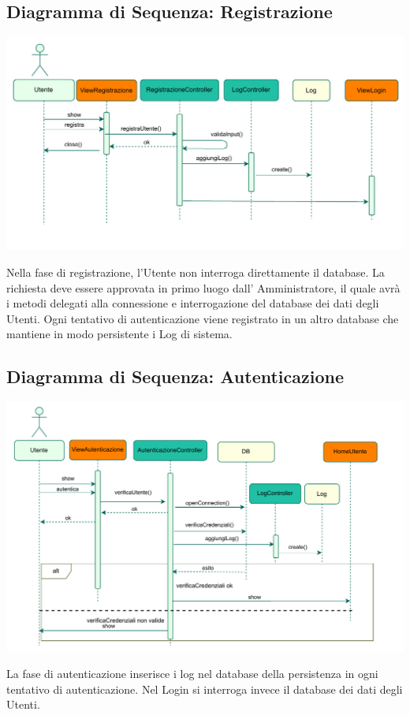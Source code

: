 \subsection*{Diagramma di Sequenza: Registrazione}
{}
\vspace{2cm}
\begin{adjustwidth}{-2cm}{0cm}
\includegraphics[scale=0.9]{progettazione/Diagramma-Sequenza-Interazione-Registrazione.drawio.pdf}
\end{adjustwidth}
\vspace{0.5cm}
Nella fase di registrazione, l'Utente non interroga direttamente il database. La richiesta deve essere approvata in primo luogo dall' Amministratore, il quale avrà i metodi delegati alla connessione e interrogazione del database dei dati degli Utenti.
Ogni tentativo di autenticazione viene registrato in un altro database che mantiene in modo persistente i Log di sistema.

\subsection*{Diagramma di Sequenza: Autenticazione}
{}
\vspace{2cm}
\begin{adjustwidth}{-2cm}{0cm}
\includegraphics[scale=0.9]{progettazione/Diagramma-Sequenza-Interazione-Autenticazione.drawio.pdf}
\end{adjustwidth}
\vspace{0.5cm}
La fase di autenticazione inserisce i log nel database della persistenza in ogni tentativo di autenticazione. Nel Login si interroga invece il database dei dati degli Utenti.


